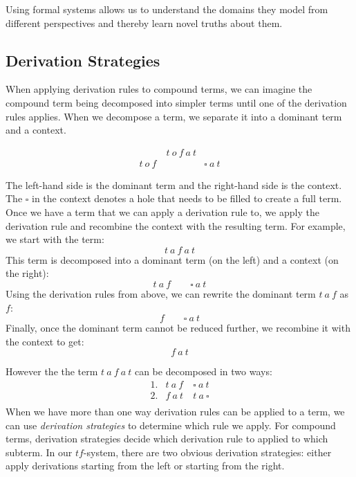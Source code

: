 Using formal systems allows us to understand the domains they model from
different perspectives and thereby learn novel truths about them.

\subsection{Derivation Strategies}

When applying derivation rules to compound terms, we can imagine the 
compound term being decomposed into simpler terms until one of the 
derivation rules applies. When we decompose a term, we separate it into a
dominant term and a context.

\begin{figure}[!h]\label{fig:decomposing}
\[
\begin{array}{lcr}
  & t\ o\ f\ a\ t \\
  t\ o\ f\ && \square\ a\ t 
\end{array}
\]
\end{figure}

The left-hand side is the dominant term and the right-hand side is the context. 
The $\square$ in the context denotes a hole that needs to be filled to create a full term.
Once we have a term that we can apply a derivation rule to, 
we apply the derivation rule and recombine the context with the resulting term. 
For example, we start with the term:
\[
  t\ a\ f\ a\ t
\]
This term is decomposed into a dominant term (on the left) and a context (on the right):
\[
  t\ a\ f \quad\quad \square\ a\ t
\]
Using the derivation rules from above, we can rewrite the dominant term $t\ a\ f$ as $f$:
\[
  f \quad\quad \square\ a\ t
\]
Finally, once the dominant term cannot be reduced further, we recombine it with the context to get:
\[
  f\ a\ t
\]

However the the term $t\ a\ f\ a\ t$ can be decomposed in two ways:
\[
\begin{array}{rlr}
  1. & t\ a\ f\ & \square\ a\ t  \\
  2. & f\ a\ t & t\ a\ \square  \\
\end{array}
\]
When we have more than one way derivation rules can be applied to a term,
we can use \emph{derivation strategies} to determine which rule we apply.
For compound terms, derivation strategies decide which derivation rule to applied to which subterm.
In our $tf$-system, there are two obvious derivation strategies:
either apply derivations starting from the left or starting from the right.

